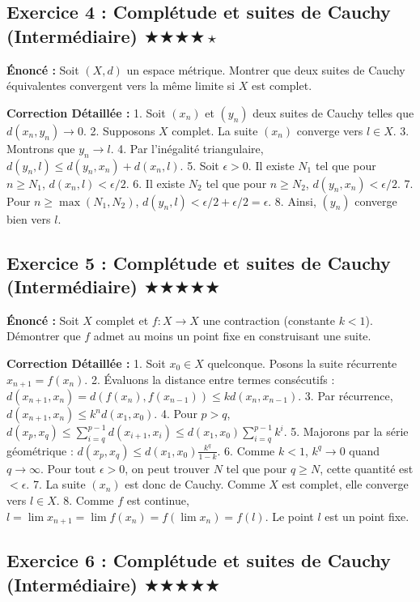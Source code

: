 \documentclass[11pt,a4paper]{article}
\begin{document}
\subsection*{Exercice 4 : Complétude et suites de Cauchy (Intermédiaire) \quad $\bigstar\bigstar\bigstar\bigstar\star$}

\textbf{Énoncé :}
Soit $(X, d)$ un espace métrique. Montrer que deux suites de Cauchy équivalentes convergent vers la même limite si $X$ est complet.

\textbf{Correction Détaillée :}
1. Soit $(x_n)$ et $(y_n)$ deux suites de Cauchy telles que $d(x_n, y_n) \to 0$.
2. Supposons $X$ complet. La suite $(x_n)$ converge vers $l \in X$.
3. Montrons que $y_n \to l$.
4. Par l'inégalité triangulaire, $d(y_n, l) \leq d(y_n, x_n) + d(x_n, l)$.
5. Soit $\epsilon > 0$. Il existe $N_1$ tel que pour $n \ge N_1$, $d(x_n, l) < \epsilon/2$.
6. Il existe $N_2$ tel que pour $n \ge N_2$, $d(y_n, x_n) < \epsilon/2$.
7. Pour $n \ge \max(N_1, N_2)$, $d(y_n, l) < \epsilon/2 + \epsilon/2 = \epsilon$.
8. Ainsi, $(y_n)$ converge bien vers $l$.


\subsection*{Exercice 5 : Complétude et suites de Cauchy (Intermédiaire) \quad $\bigstar\bigstar\bigstar\bigstar\bigstar$}

\textbf{Énoncé :}
Soit $X$ complet et $f: X \to X$ une contraction (constante $k < 1$). Démontrer que $f$ admet au moins un point fixe en construisant une suite.

\textbf{Correction Détaillée :}
1. Soit $x_0 \in X$ quelconque. Posons la suite récurrente $x_{n+1} = f(x_n)$.
2. Évaluons la distance entre termes consécutifs : $d(x_{n+1}, x_n) = d(f(x_n), f(x_{n-1})) \leq k d(x_n, x_{n-1})$.
3. Par récurrence, $d(x_{n+1}, x_n) \leq k^n d(x_1, x_0)$.
4. Pour $p > q$, $d(x_p, x_q) \leq \sum_{i=q}^{p-1} d(x_{i+1}, x_i) \leq d(x_1, x_0) \sum_{i=q}^{p-1} k^i$.
5. Majorons par la série géométrique : $d(x_p, x_q) \leq d(x_1, x_0) \frac{k^q}{1-k}$.
6. Comme $k < 1$, $k^q \to 0$ quand $q \to \infty$. Pour tout $\epsilon > 0$, on peut trouver $N$ tel que pour $q \ge N$, cette quantité est $< \epsilon$.
7. La suite $(x_n)$ est donc de Cauchy. Comme $X$ est complet, elle converge vers $l \in X$.
8. Comme $f$ est continue, $l = \lim x_{n+1} = \lim f(x_n) = f(\lim x_n) = f(l)$. Le point $l$ est un point fixe.


\subsection*{Exercice 6 : Complétude et suites de Cauchy (Intermédiaire) \quad $\bigstar\bigstar\bigstar\bigstar\bigstar$}
\end{document}
